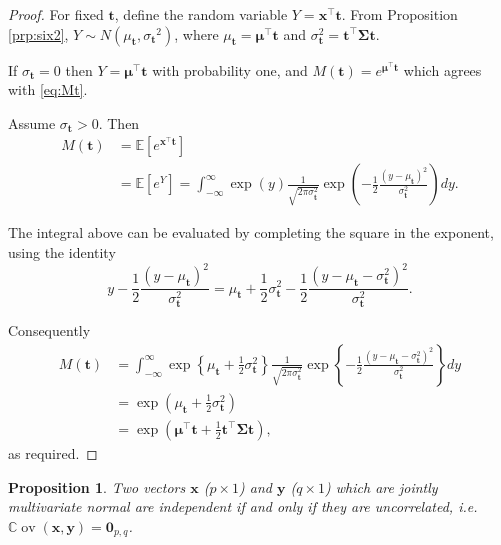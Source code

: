 \documentclass[]{book}
\newtheorem{proposition}{Proposition}[chapter]
\theoremstyle{definition}
\theoremstyle{definition}
\theoremstyle{definition}
\theoremstyle{remark}
\begin{document}
\begin{proof}
{}For fixed \({\boldsymbol t}\), define the random variable \(Y=\boldsymbol x^\top {\boldsymbol t}\). From Proposition \ref{prp:six2},
\(Y \sim N(\mu_{{\boldsymbol t}}, {\sigma_{\boldsymbol t}}^2)\),
where \(\mu_{\boldsymbol t}=\boldsymbol \mu^\top {\boldsymbol t}\) and \(\sigma^2_{\boldsymbol t}={\boldsymbol t}^\top \boldsymbol \Sigma{\boldsymbol t}\).

If \(\sigma_{\boldsymbol t}=0\) then \(Y=\boldsymbol \mu^\top {\boldsymbol t}\) with probability one, and \(M({\boldsymbol t})=e^{\boldsymbol \mu^\top {\boldsymbol t}}\) which agrees with \eqref{eq:Mt}.

Assume \(\sigma_{{\boldsymbol t}}>0\). Then
\begin{align*}
M({\boldsymbol t})&={\mathbb{E}}[e^{\boldsymbol x^\top {\boldsymbol t}}]\\
&={\mathbb{E}}[e^{Y}]=\int_{-\infty}^\infty \exp(y) \frac{1}{\sqrt{2\pi \sigma_{\boldsymbol t}^2}}
\exp\left (-\frac{1}{2}\frac{(y-\mu_{\boldsymbol t})^2}{\sigma_{\boldsymbol t}^2} \right )dy.
\end{align*}

The integral above can be evaluated by completing the square in the exponent, using the identity
\[
y-\frac{1}{2}\frac{(y-\mu_{\boldsymbol t})^2}{\sigma_{\boldsymbol t}^2}=\mu_{\boldsymbol t}
+\frac{1}{2}\sigma_{\boldsymbol t}^2-\frac{1}{2}\frac{(y-\mu_{\boldsymbol t}-\sigma_{\boldsymbol t}^2)^2}{\sigma_{\boldsymbol t}^2}.
\]

Consequently
\begin{align*}
M({\boldsymbol t})&=\int_{-\infty}^\infty \exp \left\{\mu_{\boldsymbol t}+\frac{1}{2}\sigma_{\boldsymbol t}^2 \right\}
\frac{1}{\sqrt{2 \pi \sigma_{\boldsymbol t}^2}}\exp \left\{ -\frac{1}{2} \frac{(y-\mu_{\boldsymbol t}-\sigma_{\boldsymbol t}^2)^2}
{\sigma_{\boldsymbol t}^2}\right\}dy\\
&=\exp\left( \mu_{\boldsymbol t}+ \frac{1}{2}\sigma_{\boldsymbol t}^2  \right)\\
&=\exp\left(
\boldsymbol \mu^\top {\boldsymbol t}+ \frac{1}{2}{\boldsymbol t}^\top \boldsymbol \Sigma{\boldsymbol t}\right),
\end{align*}
as required.
\end{proof}

\begin{proposition}
\protect\hypertarget{prp:six4}{}{\label{prp:six4} }Two vectors \(\boldsymbol x\) (\(p \times 1\)) and \(\boldsymbol y\) (\(q \times 1\)) which are jointly multivariate normal are independent if and only if they are uncorrelated, i.e. \({\mathbb{C}\operatorname{ov}}(\boldsymbol x,\boldsymbol y) = \boldsymbol 0_{p,q}\).
\end{proposition}
\end{document}
